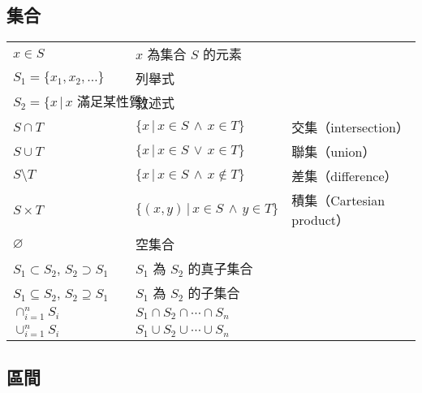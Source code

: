 \documentclass[12pt]{extarticle}
\newcommand{\ds}{\displaystyle}
\theoremstyle{definition}
\begin{document}
\subsection*{集合}

\begin{table}[!htbp]
  \centering
  \begin{tabular}{lll}
    \toprule
    $x\in S$ & $x$ 為集合 $S$ 的元素 &  \\
    $S_1 =\{x_1, x_2, \ldots\}$ & 列舉式   &  \\
    $S_2 =\{ x\,|\, x \text{ 滿足某性質}\}$ & 敘述式 & \\
    $S\cap T$ & $\{x\,|\, x\in S\,\wedge\,x\in T\}$ & 交集（intersection）   \\
    $S\cup T$ & $\{x\,|\, x\in S\,\vee\,x\in T\}$ & 聯集（union）   \\
    $S\setminus T$ & $\{x\,|\, x\in S\,\wedge\,x\not\in T\}$ & 差集（difference）  \\
    $S\times T$ & $\{(x, y)\,|\, x\in S\,\wedge\,y\in T\}$ & 積集（Cartesian product） \\
    $\varnothing$ & 空集合 & \\
    $S_1\subset S_2$, $S_2\supset S_1$ & $S_1$ 為 $S_2$ 的真子集合 & \\
    $S_1\subseteq S_2$, $S_2\supseteq S_1$ & $S_1$ 為 $S_2$ 的子集合 & \\
    $\ds\cap_{i=1}^n S_i$ & $S_1\cap S_2\cap\cdots\cap S_n$ &    \\
    $\ds\cup_{i=1}^n S_i$ & $S_1\cup S_2\cup\cdots\cup S_n$ &    \\
    \bottomrule
  \end{tabular}
\end{table}

\newpage

\subsection*{區間}
\end{document}
